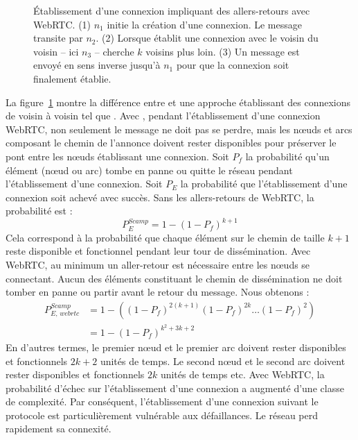 \begin{figure}
  \begin{center}
    
    \caption[Établissement d'une connexion impliquant des allers-retours avec
    WebRTC]{\label{repl:fig:handshake} Établissement d'une connexion impliquant
      des allers-retours avec WebRTC. (1) $n_1$ initie la création d'une
      connexion. Le message transite par $n_2$. (2) Lorsque \CYCLON établit une
      connexion avec le voisin du voisin -- ici $n_3$ -- \SCAMP cherche
      $k$ voisins plus loin. (3) Un message est envoyé en sens inverse
      jusqu'à $n_1$ pour que la connexion soit finalement établie.}
  \end{center}
\end{figure}

\noindent La figure~\ref{repl:fig:handshake} montre la différence entre \SCAMP
et une approche établissant des connexions de voisin à voisin tel que
\CYCLON. Avec \SCAMP, pendant l'établissement d'une connexion WebRTC, non
seulement le message ne doit pas se perdre, mais les nœuds et arcs composant le
chemin de l'annonce doivent rester disponibles pour préserver le pont entre les
nœuds établissant une connexion.  Soit $P_f$ la probabilité qu'un élément (nœud
ou arc) tombe en panne ou quitte le réseau pendant l'établissement d'une
connexion. Soit $P_E$ la probabilité que l'établissement d'une connexion soit
achevé avec succès. Sans les allers-retours de WebRTC, la probabilité est :
\begin{equation} P_{E}^{Scamp}=1-(1- P_f)^{k+1} \end{equation} Cela correspond à
la probabilité que chaque élément sur le chemin de taille $k+1$ reste disponible
et fonctionnel pendant leur tour de dissémination. Avec WebRTC, au minimum un
aller-retour est nécessaire entre les nœuds se connectant. Aucun des éléments
constituant le chemin de dissémination ne doit tomber en panne ou partir
avant le retour du message. Nous obtenons :
\begin{align} P_{E,\,webrtc}^{Scamp} &=1 - ((1-P_f)^{2(k+1)} (1-P_f)^{2k}
                                     \ldots (1-P_f)^2) \nonumber \\
                                   &=1-(1-P_f)^{k^2+3k+2}
\end{align}
En d'autres termes, le premier nœud et le premier arc doivent rester disponibles
et fonctionnels $2k +2$ unités de temps. Le second nœud et le second arc doivent
rester disponibles et fonctionnels $2k$ unités de temps etc. Avec WebRTC, la
probabilité d'échec sur l'établissement d'une connexion a augmenté d'une classe
de complexité.  Par conséquent, l'établissement d'une connexion suivant le
protocole \SCAMP est particulièrement vulnérable aux défaillances. Le réseau
perd rapidement sa connexité.


